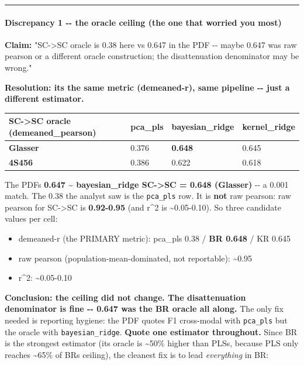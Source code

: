 \begin{center}\rule{0.5\linewidth}{0.5pt}\end{center}

\paragraph{Discrepancy 1 -\/- the oracle ceiling (the one that worried you most)}\label{discrepancy-1----the-oracle-ceiling-the-one-that-worried-you-most}

\textbf{Claim:} "SC-\textgreater SC oracle is 0.38 here vs 0.647 in the PDF -\/- maybe 0.647 was raw pearson or a different oracle construction; the disattenuation denominator may be wrong."

\textbf{Resolution: it\textquotesingle s the same metric (demeaned-r), same pipeline -\/- just a different estimator.}

{\def\LTcaptype{none} %
\begin{longtable}[]{@{}llll@{}}
\toprule\noalign{}
SC-\textgreater SC oracle (demeaned\_pearson) & pca\_pls & bayesian\_ridge & kernel\_ridge \\
\midrule\noalign{}
\endhead
\bottomrule\noalign{}
\endlastfoot
\textbf{Glasser} & 0.376 & \textbf{0.648} & 0.645 \\
\textbf{4S456} & 0.386 & 0.622 & 0.618 \\
\end{longtable}
}

The PDF\textquotesingle s \textbf{0.647 \textasciitilde{} bayesian\_ridge SC-\textgreater SC = 0.648 (Glasser)} -\/- a 0.001 match. The 0.38 the analyst saw is the \texttt{pca\_pls} row. It is \textbf{not} raw pearson: raw pearson for SC-\textgreater SC is \textbf{0.92-0.95} (and r\^{}2 is \textasciitilde0.05-0.10). So three candidate values per cell:

\begin{itemize}
\tightlist
\item
  demeaned-r (the PRIMARY metric): pca\_pls 0.38 / \textbf{BR 0.648} / KR 0.645
\item
  raw pearson (population-mean-dominated, not reportable): \textasciitilde0.95
\item
  r\^{}2: \textasciitilde0.05-0.10
\end{itemize}

\textbf{Conclusion: the ceiling did not change. The disattenuation denominator is fine -\/- 0.647 was the BR oracle all along.} The only fix needed is reporting hygiene: the PDF quotes F1 cross-modal with \texttt{pca\_pls} but the oracle with \texttt{bayesian\_ridge}. \textbf{Quote one estimator throughout.} Since BR is the strongest estimator (its oracle is \textasciitilde50\% higher than PLS\textquotesingle s, because PLS only reaches \textasciitilde65\% of BR\textquotesingle s ceiling), the cleanest fix is to lead \emph{everything} in BR:

